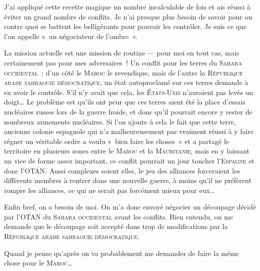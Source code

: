 {	J’ai appliqué cette recette magique un nombre incalculable de fois et ais réussi à éviter un grand nombre de conflits.
	Je n’ai presque plus besoin de savoir pour ou contre quoi se battent les belligérants pour pouvoir les contrôler.
	Je suis ce que l’on appelle «~un négociateur de l’ombre~».

	La mission actuelle est une mission de routine — pour moi en tout cas, mais certainement pas pour mes adversaires~!
	Un conflit pour les terres du \textsc{Sahara occidental}~:  d’un côté le \textsc{Maroc} le revendique, mais de l’autre la \textsc{République arabe sahraouie démocratique}, un état autoproclamé sur ces terres demande à en avoir le contrôle.
	S’il n’y avait que cela, les \textsc{États-Unis} n’auraient pas levés un doigt…  Le problème est qu’ils ont peur que ces terres aient été la place d’essais nucléaires russes lors de la guerre froide, et donc qu’il pourrait encore y rester de nombreux armements nucléaires.
	Si l’on ajoute à cela le fait que cette terre, ancienne colonie espagnole qui n’a malheureusement pas vraiment réussi à y faire régner un véritable ordre a voulu «~bien faire les choses~» et a partagé le territoire en plusieurs zones entre le \textsc{Maroc} et la \textsc{Mauritanie}, mais en y laissant un vice de forme assez important, ce conflit pourrait un jour toucher l’\textsc{Espagne} et donc l’\textsc{OTAN}.
	Aussi complexes soient elles, le jeu des alliances forceraient les différents membres à rentrer dans une nouvelle guerre, à moins qu’il ne préfèrent rompre les alliances, ce qui ne serait pas forcément mieux pour eux…

	Enfin bref, on a besoin de moi.
	On m’a donc envoyé négocier un découpage décidé par l’\textsc{OTAN} du \textsc{Sahara occidental} avant les conflits.
	Bien entendu, on me demande que le découpage soit accepté dans trop de modifications par la \textsc{République arabe sahraouie démocratique}.

	Quand je pense qu’après on va probablement me demander de faire la même chose pour le \textsc{Maroc}…
}

